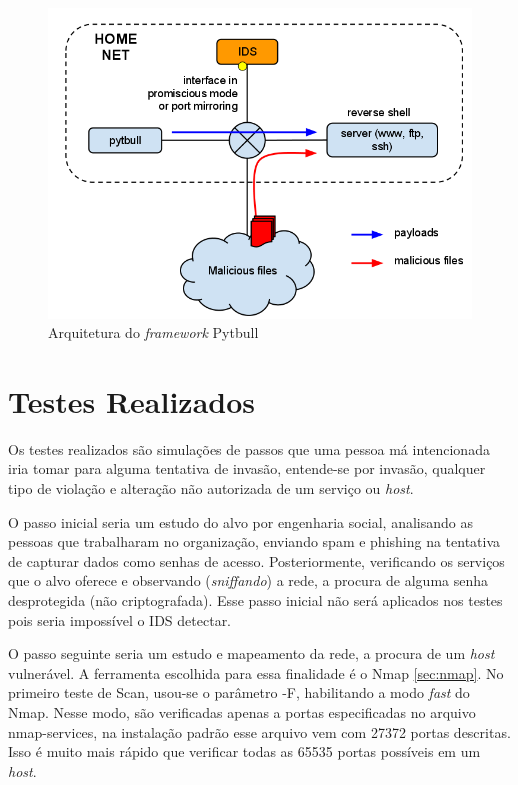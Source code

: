 \documentclass[
	12pt,				
	openright,		
	twoside,	
	a4paper,
	english,	
	brazil	
	]{abntex2}
\begin{document}
\begin{figure}
 \centering
 \includegraphics[scale=.4]{arquitetura_pytbull.png}
 \caption{Arquitetura do \textit{framework} Pytbull}
 \label{fig:pytbull}
\end{figure}

\section{Testes Realizados} \label{sec:testes}
Os testes realizados são simulações de passos que uma pessoa má intencionada iria tomar para alguma tentativa de invasão, entende-se por invasão, qualquer tipo de violação e alteração não autorizada de um serviço ou \textit{host}.

O passo inicial seria um estudo do alvo por engenharia social, analisando as pessoas que trabalharam no organização, enviando spam e phishing na tentativa de capturar dados como senhas de acesso. Posteriormente, verificando os serviços que o alvo oferece e observando (\textit{sniffando}) a rede, a procura de alguma senha desprotegida (não criptografada). Esse passo inicial não será aplicados nos testes pois seria impossível o IDS detectar.

O passo seguinte seria um estudo e mapeamento da rede, a procura de um \textit{host} vulnerável. A ferramenta escolhida para essa finalidade é o Nmap \ref{sec:nmap}. No primeiro teste de Scan, usou-se o parâmetro -F, habilitando a modo \textit{fast} do Nmap. Nesse modo, são verificadas apenas a portas especificadas no arquivo nmap-services, na instalação padrão esse arquivo vem com 27372 portas descritas. Isso é muito mais rápido que verificar todas as 65535 portas possíveis em um \textit{host}.
\end{document}

